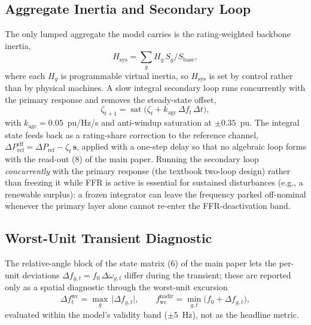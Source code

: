 \documentclass[lettersize,journal]{IEEEtran}
\begin{document}
\subsection{Aggregate Inertia and Secondary Loop}
The only lumped aggregate the model carries is the rating-weighted backbone inertia,
\begin{equation}
  H_{\mathrm{sys}}=\sum_g H_g\,S_g/S_{\mathrm{base}},
  \label{eq:hsys}
\end{equation}
where each $H_g$ is programmable virtual inertia, so $H_{\mathrm{sys}}$ is set by control rather than by physical machines. A slow integral secondary loop runs concurrently with the primary response and removes the steady-state offset,
\begin{equation}
  \zeta_{t+1}=\operatorname{sat}\!\big(\zeta_t+k_{\mathrm{agc}}\,\Delta f_t\,\Delta t\big),
  \label{eq:agc}
\end{equation}
with $k_{\mathrm{agc}}=0.05$~pu/Hz/s and anti-windup saturation at $\pm0.35$~pu. The integral state feeds back as a rating-share correction to the reference channel, $\Delta P_{\mathrm{ref}}^{\mathrm{eff}}=\Delta P_{\mathrm{ref}}-\zeta_t\,\mathbf s$, applied with a one-step delay so that no algebraic loop forms with the read-out (8) of the main paper. Running the secondary loop \emph{concurrently} with the primary response (the textbook two-loop design) rather than freezing it while FFR is active is essential for sustained disturbances (e.g., a renewable surplus): a frozen integrator can leave the frequency parked off-nominal whenever the primary layer alone cannot re-enter the FFR-deactivation band.

\subsection{Worst-Unit Transient Diagnostic}
The relative-angle block of the state matrix (6) of the main paper lets the per-unit deviations $\Delta f_{g,t}=f_0\,\Delta\omega_{g,t}$ differ during the transient; these are reported only as a spatial diagnostic through the worst-unit excursion
\begin{equation}
  \Delta f^{\mathrm{wc}}_t=\max_{g}\,\big|\Delta f_{g,t}\big|,
  \qquad
  f^{\mathrm{nadir}}_{\mathrm{wc}}=\min_{g,t}\big(f_0+\Delta f_{g,t}\big),
  \label{eq:worstunit}
\end{equation}
evaluated within the model's validity band ($\pm5$~Hz), not as the headline metric.
\end{document}
